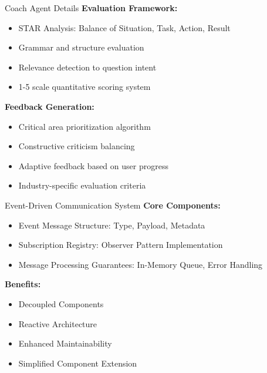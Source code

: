 \documentclass{beamer}
\begin{document}
\begin{frame}{Coach Agent Details}
    \textbf{Evaluation Framework:}
    \begin{itemize}
        \item STAR Analysis: Balance of Situation, Task, Action, Result
        \item Grammar and structure evaluation
        \item Relevance detection to question intent
        \item 1-5 scale quantitative scoring system
    \end{itemize}
    
    \textbf{Feedback Generation:}
    \begin{itemize}
        \item Critical area prioritization algorithm
        \item Constructive criticism balancing
        \item Adaptive feedback based on user progress
        \item Industry-specific evaluation criteria
    \end{itemize}
\end{frame}

\begin{frame}{Event-Driven Communication System}
    \textbf{Core Components:}
    \begin{itemize}
        \item Event Message Structure: Type, Payload, Metadata
        \item Subscription Registry: Observer Pattern Implementation
        \item Message Processing Guarantees: In-Memory Queue, Error Handling
    \end{itemize}
    
    \textbf{Benefits:}
    \begin{itemize}
        \item Decoupled Components
        \item Reactive Architecture
        \item Enhanced Maintainability
        \item Simplified Component Extension
    \end{itemize}
\end{frame}
\end{document}
